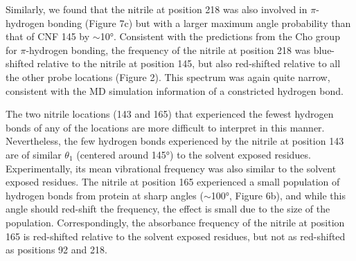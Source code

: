 Similarly, we found that the nitrile at position 218 was also involved in $\pi$-hydrogen bonding (Figure 7c) but with a larger maximum angle probability than that of CNF 145 by $\sim$\ang{10}.
Consistent with the predictions from the Cho group for $\pi$-hydrogen bonding, the frequency of the nitrile at position 218 was blue-shifted relative to the nitrile at position 145, but also red-shifted relative to all the other probe locations (Figure 2).
This spectrum was again quite narrow, consistent with the MD simulation information of a constricted hydrogen bond. 

The two nitrile locations (143 and 165) that experienced the fewest hydrogen bonds of any of the locations are more difficult to interpret in this manner.
Nevertheless, the few hydrogen bonds experienced by the nitrile at position 143 are of similar $\theta_1$ (centered around \ang{145}) to the solvent exposed residues.
Experimentally, its mean vibrational frequency was also similar to the solvent exposed residues.
The nitrile at position 165 experienced a small population of hydrogen bonds from protein at sharp angles ($\sim$\ang{100}, Figure 6b), and while this angle should red-shift the frequency, the effect is small due to the size of the population.
Correspondingly, the absorbance frequency of the nitrile at position 165 is red-shifted relative to the solvent exposed residues, but not as red-shifted as positions 92 and 218. 

